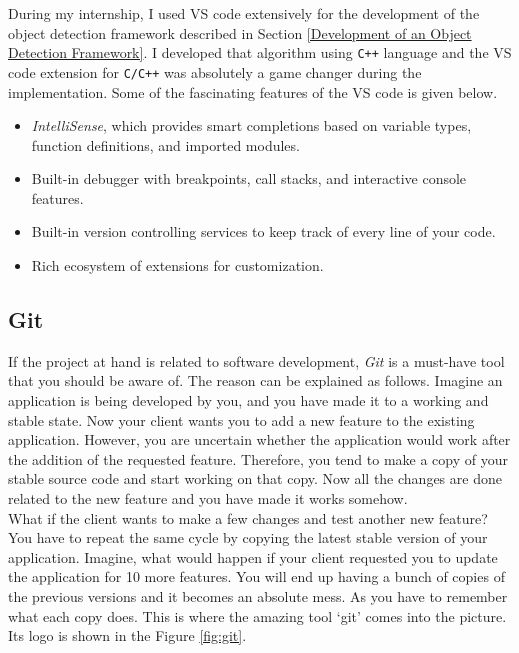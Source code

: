 \documentclass[a4paper,12pt]{report}%
\begin{document}
During my internship, I used VS code extensively for the development of the object detection framework described in Section \ref{Development of an Object Detection Framework}. I developed that algorithm using {\tt C++} language and the VS code extension for {\tt C/C++} was absolutely a game changer during the implementation. Some of the fascinating features of the VS code is given below\cite{vscode}.

\begin{itemize}
	\item \textit{IntelliSense}, which provides smart completions based on variable types, function definitions, and imported modules.
	
	\item Built-in debugger with breakpoints, call stacks, and interactive console features.
	
	\item Built-in version controlling services to keep track of every line of your code.
	
	\item Rich ecosystem of extensions for customization.
\end{itemize}



\subsection{Git}

If the project at hand is related to software development, \textit{Git} is a must-have tool that you should be aware of. The reason can be explained as follows. Imagine an application is being developed by you, and you have made it to a working and stable state. Now your client wants you to add a new feature to the existing application. However, you are uncertain whether the application would work after the addition of the requested feature. Therefore, you tend to make a copy of your stable source code and start working on that copy. Now all the changes are done related to the new feature and you have made it works somehow.\\

What if the client wants to make a few changes and test another new feature? You have to repeat the same cycle by copying the latest stable version of your application. Imagine, what would happen if your client requested you to update the application for 10 more features. You will end up having a bunch of copies of the previous versions and it becomes an absolute mess. As you have to remember what each copy does. This is where the amazing tool `git' comes into the picture. Its logo is shown in the Figure \ref{fig:git}.\\
\end{document}
